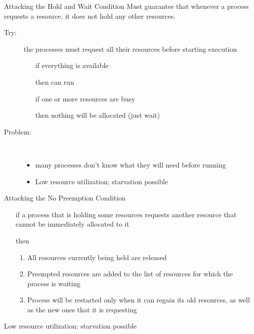 \begin{frame}
  \begin{block}{Attacking the Hold and Wait Condition}
    Must guarantee that whenever a process requests a resource, it does not hold any other
    resources.
    \begin{description}
    \item[Try:] the processes must request all their resources before starting
      execution
      \begin{itemize}
      \item[if] everything is available
      \item[then] can run
      \item[if] one or more resources are busy
      \item[then] nothing will be allocated (just wait)
      \end{itemize}
    \item[Problem:] \ 
      \begin{itemize}
      \item many processes don't know what they will need before running
      \item Low resource utilization; starvation possible
      \end{itemize}
    \end{description}
  \end{block}
\end{frame}

\begin{frame}
  \begin{block}{Attacking the No Preemption Condition}
    \begin{itemize}
    \item[if] a process that is holding some resources requests another resource that
      cannot be immediately allocated to it
    \item[then]
      \begin{enumerate}
      \item All resources currently being held are released
      \item Preempted resources are added to the list of resources for which the process
        is waiting
      \item Process will be restarted only when it can regain its old resources, as well
        as the new ones that it is requesting
      \end{enumerate}
    \end{itemize}
  \end{block}
  Low resource utilization; starvation possible
\end{frame}

